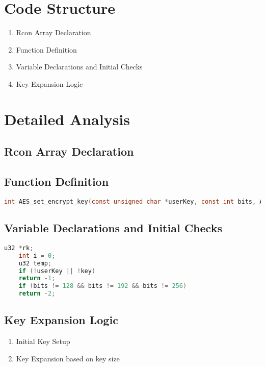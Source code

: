 \newpage
\section{Code Structure}
\begin{enumerate}
	\item Rcon Array Declaration
	\item Function Definition
	\item Variable Declarations and Initial Checks
	\item Key Expansion Logic
\end{enumerate}

\section{Detailed Analysis}
\subsection{Rcon Array Declaration}


\subsection{Function Definition}
\begin{lstlisting}[language=C]
	int AES_set_encrypt_key(const unsigned char *userKey, const int bits, AES_KEY *key);
\end{lstlisting}

\subsection{Variable Declarations and Initial Checks}
\begin{lstlisting}[language=C]
	u32 *rk;
	int i = 0;
	u32 temp;
	if (!userKey || !key)
	return -1;
	if (bits != 128 && bits != 192 && bits != 256)
	return -2;
\end{lstlisting}

\subsection{Key Expansion Logic}
\begin{enumerate}
	\item Initial Key Setup
	\item Key Expansion based on key size
\end{enumerate}

